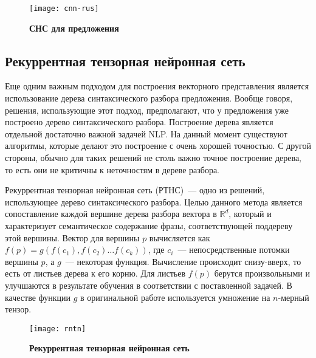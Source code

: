 \begin{figure}[h]
\texttt{[image: cnn-rus]}
\caption{\textbf{СНС для предложения}}
\label{fig:cnn}
\end{figure}

\subsection{Рекуррентная тензорная нейронная сеть}
Еще одним важным подходом для построения векторного представления является использование 
дерева синтаксического разбора предложения. Вообще говоря, решения, использующие этот подход, предполагают, что у предложения уже построено дерево синтаксического разбора. Построение дерева является отдельной достаточно важной задачей NLP. На данный момент существуют алгоритмы, которые делают это построение с очень хорошей точностью\cite{lex-parser, chen2014fast}. 
С другой стороны, обычно для таких решений не столь важно точное построение дерева, то есть они не критичны к неточностям в дереве разбора.

Рекуррентная тензорная нейронная сеть (РТНС)~--- одно из решений, использующее дерево синтаксического разбора. Целью данного метода является сопоставление каждой вершине дерева разбора вектора в $\mathbb{R}^d$, 
который и характеризует семантическое содержание фразы, соответствующей поддереву этой вершины.
Вектор для вершины $p$ вычисляется как $f(p)=g(f(c_1), f(c_2) \dots{} f(c_k))$, где $c_i$~--- непосредственные потомки вершины $p$, а $g$~--- некоторая функция. Вычисление происходит снизу-вверх, то
есть от листьев дерева к его корню. Для листьев $f(p)$ берутся произвольными и улучшаются в результате обучения в соответствии с поставленной задачей.
В качестве функции $g$ в оригинальной работе\cite{socher-EtAl:2013:EMNLP} используется умножение на $n$-мерный тензор.

\begin{figure}[h]
\texttt{[image: rntn]}
\caption{\textbf{Рекуррентная тензорная нейронная сеть}}
\label{fig:rntn}
\end{figure}

\finishrelatedwork